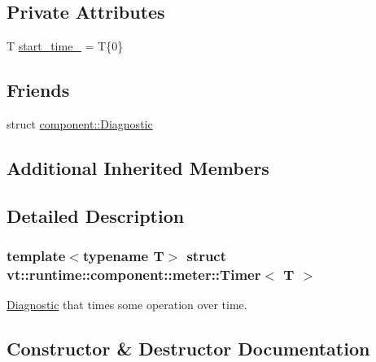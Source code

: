 \subsection*{Private Attributes}
\begin{DoxyCompactItemize}
\item 
T \hyperlink{structvt_1_1runtime_1_1component_1_1meter_1_1_timer_a097137934875f01d9e9ed8653916df64}{start\+\_\+time\+\_\+} = T\{0\}
\end{DoxyCompactItemize}
\subsection*{Friends}
\begin{DoxyCompactItemize}
\item 
struct \hyperlink{structvt_1_1runtime_1_1component_1_1meter_1_1_timer_a48f263de9dbf26c1fc7736031cca9613}{component\+::\+Diagnostic}
\end{DoxyCompactItemize}
\subsection*{Additional Inherited Members}


\subsection{Detailed Description}
\subsubsection*{template$<$typename T$>$\newline
struct vt\+::runtime\+::component\+::meter\+::\+Timer$<$ T $>$}

\hyperlink{structvt_1_1runtime_1_1component_1_1_diagnostic}{Diagnostic} that times some operation over time. 

\subsection{Constructor \& Destructor Documentation}
\mbox{\label{structvt_1_1runtime_1_1component_1_1meter_1_1_timer_af32ee3397a43cd6af675904d70295211}} 
